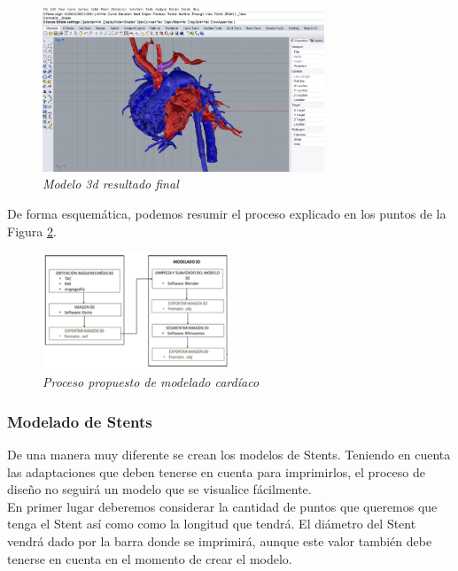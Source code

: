 \documentclass[a4paper,12pt]{article}
\begin{document}
	\begin{figure}[!ht]
	\begin{center}
	  \includegraphics[width=0.75\textwidth]{Figuras/mod_05.png}
	  \caption{\emph{Modelo 3d resultado final}}
	\end{center}
	\label{fig:mod_05}
	\end{figure}

De forma esquemática, podemos resumir el proceso explicado en los puntos de la Figura \ref{modeloCardio}.\\

	\begin{figure}[!ht]
	\begin{center}
	  \includegraphics[width=0.5\textwidth]{Figuras/modeloCardio.png}
	  \caption{\emph{Proceso propuesto de modelado cardíaco}}
	\end{center}
	\label{modeloCardio}
	\end{figure}

\subsubsection{Modelado de Stents}
De una manera muy diferente se crean los modelos de Stents. Teniendo en cuenta las adaptaciones que deben tenerse en cuenta para imprimirlos, el proceso de diseño no seguirá un modelo que se visualice fácilmente.\\

En primer lugar deberemos considerar la cantidad de puntos que queremos que tenga el Stent así como como la longitud que tendrá. El diámetro del Stent vendrá dado por la barra donde se imprimirá, aunque este valor también debe tenerse en cuenta en el momento de crear el modelo.\\
\end{document}
